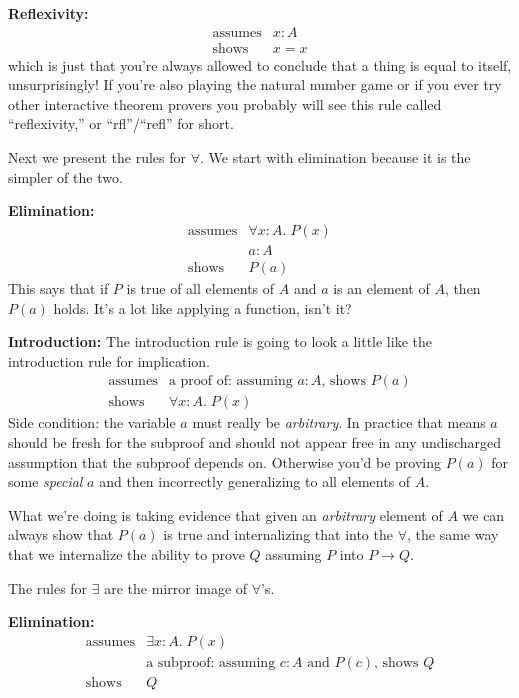 \documentclass[11pt]{article}
\begin{document}
\noindent\textbf{Reflexivity:}
\[
  \begin{array}{rl}
    \text{assumes} & x : A \\
    \hline
    \text{shows} & x = x
  \end{array}
\]
which is just that you're always allowed to conclude that a thing is equal to itself, unsurprisingly! If you're also playing the natural number game or if you ever try other interactive theorem provers you probably will see this rule called ``reflexivity,'' or ``rfl''/``refl'' for short.

Next we present the rules for $\forall$. We start with elimination because it is the simpler of the two.

\noindent\textbf{Elimination:}
\[
  \begin{array}{rl}
    \text{assumes} & \forall x : A.\; P(x) \\
                   & a : A \\
    \hline
    \text{shows} & P(a)
  \end{array}
\]
This says that if $P$ is true of all elements of $A$ and $a$ is an element of $A$, then $P(a)$ holds. It's a lot like applying a function, isn't it?

\noindent\textbf{Introduction:}
The introduction rule is going to look a little like the introduction rule for implication.
\[
  \begin{array}{rl}
    \text{assumes} & \text{a proof of: assuming $a : A$, shows $P(a)$} \\
    \hline
    \text{shows} & \forall x : A.\; P(x)
  \end{array}
\]
Side condition: the variable $a$ must really be \emph{arbitrary}. In practice that means $a$ should be fresh for the subproof and should not appear free in any undischarged assumption that the subproof depends on. Otherwise you'd be proving $P(a)$ for some \emph{special} $a$ and then incorrectly generalizing to all elements of $A$.

What we're doing is taking evidence that given an \emph{arbitrary} element of $A$ we can always show that $P(a)$ is true and internalizing that into the $\forall$, the same way that we internalize the ability to prove $Q$ assuming $P$ into $P \to Q$.

The rules for $\exists$ are the mirror image of $\forall$'s.

\noindent\textbf{Elimination:}
\[
  \begin{array}{rl}
    \text{assumes} & \exists x : A.\; P(x) \\
                   & \text{a subproof: assuming $c : A$ and $P(c)$, shows $Q$} \\
    \hline
    \text{shows} & Q
  \end{array}
\]
\end{document}
